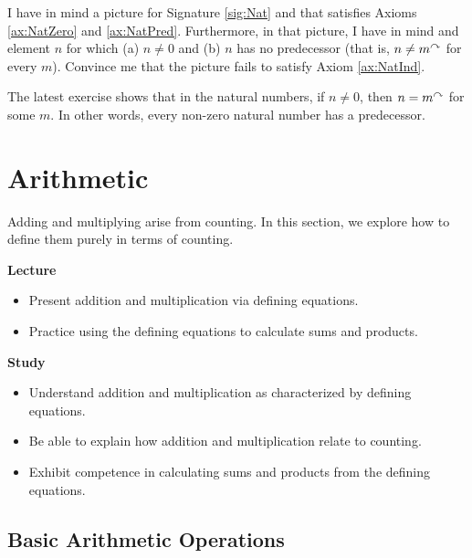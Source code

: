 \begin{exercises}
\begin{multicols}{2}
\begin{enumerate}
\end{enumerate}
\end{multicols}

\item\label{exer:cases} I have in mind a picture for Signature \ref{sig:Nat} and that satisfies Axioms \ref{ax:NatZero}
and \ref{ax:NatPred}. Furthermore, in that picture, I have in mind and element $n$ for which (a) $n\neq 0$
and (b) $n$ has no predecessor (that is, $n\neq m^\curvearrowright$ for every $m$). Convince me that
the picture fails to satisfy Axiom \ref{ax:NatInd}.
\end{exercises}

The latest exercise shows that in the natural numbers, if $n\neq 0$, then $n = m^\curvearrowright$ for some $m$. In other
words, every non-zero natural number has a predecessor. 


\chapter{Arithmetic}

Adding and multiplying arise from counting. In this section, we explore how to define them purely in terms of counting.

\medskip
\begin{goals}
\tightlists
\noindent\textbf{Lecture}
\begin{itemize}
\item Present addition and multiplication via defining equations.
\item Practice using the defining equations to calculate sums and products.
\end{itemize}

\noindent\textbf{Study}
\begin{itemize}
  \item Understand addition and multiplication as characterized by defining equations.
  \item Be able to explain how addition and multiplication relate to counting.
  \item Exhibit competence in calculating sums and products from the defining equations.
\end{itemize}
\end{goals}

\ipadbreak

\section{Basic Arithmetic Operations}

